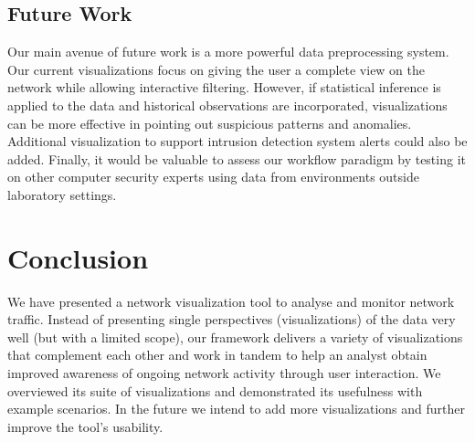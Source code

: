 \subsection{Future Work}
%
Our main avenue of future work is a more powerful data preprocessing system. Our current
visualizations focus on giving the user a complete view on the network while allowing interactive
filtering. However, if statistical inference is applied to the data and historical observations are
incorporated, visualizations can be more effective in pointing out suspicious patterns and
anomalies. Additional visualization to support intrusion detection system alerts could also be
added. Finally, it would be valuable to assess our workflow paradigm by testing it on other computer
security experts using data from environments outside laboratory settings. 

\section{Conclusion} \label{sec:conc}
%
We have presented a network visualization tool to analyse and monitor network traffic. Instead of
presenting single perspectives (visualizations) of the data very well (but with a limited scope),
our framework delivers a variety of visualizations that complement each other and work in tandem to
help an analyst obtain improved awareness of ongoing network activity through user interaction. We
overviewed its suite of visualizations and demonstrated its usefulness with example scenarios. In
the future we intend to add more visualizations and further improve the tool's usability.





